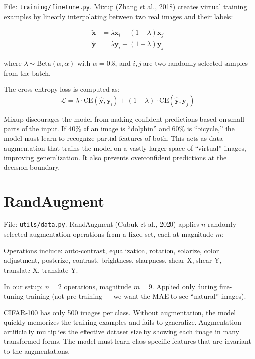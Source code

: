 \documentclass[12pt, a4paper]{report}
\newcommand{\vect}[1]{\bm{#1}}
\begin{document}
File: \texttt{training/finetune.py}. Mixup (Zhang et al., 2018) creates virtual training examples by linearly interpolating between two real images and their labels:

\begin{align}
\tilde{\vect{x}} &= \lambda \vect{x}_i + (1 - \lambda) \vect{x}_j \\
\tilde{\vect{y}} &= \lambda \vect{y}_i + (1 - \lambda) \vect{y}_j
\end{align}

where $\lambda \sim \text{Beta}(\alpha, \alpha)$ with $\alpha = 0.8$, and $i, j$ are two randomly selected samples from the batch.

The cross-entropy loss is computed as:
\begin{equation}
\mathcal{L} = \lambda \cdot \text{CE}(\hat{\vect{y}}, \vect{y}_i) + (1 - \lambda) \cdot \text{CE}(\hat{\vect{y}}, \vect{y}_j)
\end{equation}

\begin{intuitionbox}
Mixup discourages the model from making confident predictions based on small parts of the input. If 40\% of an image is ``dolphin'' and 60\% is ``bicycle,'' the model must learn to recognize partial features of both. This acts as data augmentation that trains the model on a vastly larger space of ``virtual'' images, improving generalization. It also prevents overconfident predictions at the decision boundary.
\end{intuitionbox}

\section{RandAugment}

File: \texttt{utils/data.py}. RandAugment (Cubuk et al., 2020) applies $n$ randomly selected augmentation operations from a fixed set, each at magnitude $m$:

Operations include: auto-contrast, equalization, rotation, solarize, color adjustment, posterize, contrast, brightness, sharpness, shear-X, shear-Y, translate-X, translate-Y.

In our setup: $n = 2$ operations, magnitude $m = 9$. Applied only during fine-tuning training (not pre-training — we want the MAE to see ``natural'' images).

\begin{conceptbox}
CIFAR-100 has only 500 images per class. Without augmentation, the model quickly memorizes the training examples and fails to generalize. Augmentation artificially multiplies the effective dataset size by showing each image in many transformed forms. The model must learn class-specific features that are invariant to the augmentations.
\end{conceptbox}
\end{document}
